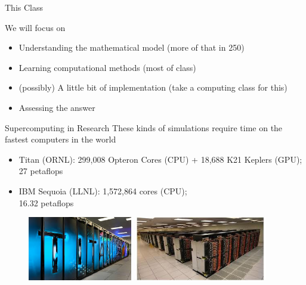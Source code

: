 \documentclass[xcolor=x11names,compress, handout]{beamer}
\renewcommand{\(}{\begin{columns}}
\renewcommand{\)}{\end{columns}}
\newcommand{\<}[1]{\begin{column}{#1}}
\renewcommand{\>}{\end{column}}
\begin{document}
\begin{frame}{This Class}

We will focus on
\begin{itemize}
\item Understanding the mathematical model (more of that in 250)
\item Learning computational methods (most of class)
\item (possibly) A little bit of implementation (take a computing class for this)
\item Assessing the answer
\end{itemize}
\end{frame}


\begin{frame}{Supercomputing in Research}
These kinds of simulations require time on the fastest computers in the world
\begin{itemize}
\item \textcolor{RawSienna}{Titan} (ORNL): 299,008 Opteron Cores (CPU) + 18,688 K21 Keplers (GPU); \textcolor{dgreen}{27 petaflops}
\item \textcolor{RawSienna}{IBM Sequoia} (LLNL): 1,572,864 cores (CPU); \\\textcolor{dgreen}{16.32 petaflops}
\end{itemize}
\begin{figure}
\includegraphics[height=1.1in,clip]{Titan}
\hfill
\includegraphics[height=1.1in,clip]{Sequoia}
\end{figure}
\end{frame}
\end{document}
